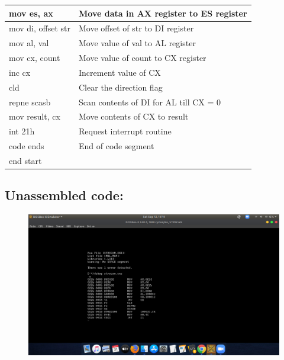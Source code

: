 \documentclass[12pt,a4paper]{article}
\begin{document}
\begin{flushleft}
\begin{table}[htb]
{\begin{tabular}{|l|l|}
\hline
mov es, ax                                                       & Move data in AX register to ES register       \\ 
\hline
mov di, offset str                                               & Move offset of str to DI register             \\ 
\hline
mov al, val                                                      & Move value of val to AL register              \\
\hline
mov cx, count                                                    & Move value of count to CX register            \\ 
\hline
inc cx                                                           & Increment value of CX                         \\
\hline
cld                                                              & Clear the direction flag                      \\
\hline
repne scasb                                                      & Scan contents of DI for AL till CX = 0        \\
\hline
mov result, cx                                                   & Move contents of CX to result                 \\
\hline
int 21h                                                          & Request interrupt routine                     \\ 
\hline
code ends                                                        & End of code segment                           \\
\hline
end start                                                        &                                               \\
\hline
\end{tabular}
}
\end{table}

\newpage
\subsection*{\textbf{Unassembled code:}}
\begin{figure}[h]
    \centering
    \includegraphics[trim = 100mm 60mm 200mm 120mm, clip, width = \textwidth]{Pics/StrscanUS.png}
\end{figure}

\end{flushleft}
\end{document}
